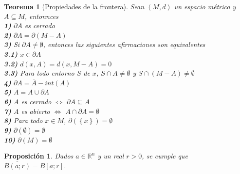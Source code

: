 \documentclass[oneside]{book} %
\theoremstyle{Teorema}
\newtheorem{Teorema}[Definicion]{Teorema}
\newtheorem{Proposicion}[Definicion]{Proposición}
\theoremstyle{Ejemplos}
\theoremstyle{[Obs]}
\renewcommand{\{}{\left\lbrace} %
\renewcommand{\}}{\right\rbrace} %
\renewcommand{\u}{\cup} %
\newcommand{\n}{\cap} %
\renewcommand{\sc}{\subseteq} %
\newcommand{\Rn}{\mathbb{R}^n} %
\begin{document}
			\begin{Teorema}[Propiedades de la frontera]
				
				Sean $(M, d)$ un espacio métrico y $A \sc M$, entonnces \\

				\textbf{1)} $\partial A$ es cerrado \\
				
				\textbf{2)} $\partial A = \partial(M - A)$ \\

				\textbf{3)} Si $\partial A \neq \emptyset$, entonces las siguientes afirmaciones son equivalentes \\

				\hspace{1cm} \textbf{3.1)} $x \in \partial A$ \\

				\hspace{1cm} \textbf{3.2)} $d(x, A) = d(x, M - A) = 0$ \\

				\hspace{1cm} \textbf{3.3)} Para todo entorno $S$ de $x$, $S \n A \neq \emptyset$ y $S \n (M - A) \neq \emptyset$ \\

				\textbf{4)} $\partial A = \overline{A} - int(A)$ \\

				\textbf{5)} $\overline{A} = A \u \partial A$ \\

				\textbf{6)} $A$ es cerrado $\Leftrightarrow$ $\partial A \sc A$ \\
				
				\textbf{7)} $A$ es abierto $\Leftrightarrow$ $A \n \partial A = \emptyset$ \\

				\textbf{8)} Para todo $x \in M$, $\partial ( \{ x \} ) = \emptyset$ \\

				\textbf{9)} $\partial(\emptyset) = \emptyset$ \\

				\textbf{10)} $\partial(M) = \emptyset$ \\

			\end{Teorema}

			\begin{Proposicion}
				
				Dados $a \in \Rn$ y un real $r > 0$, se cumple que $\overline{B(a;r)} = B[a;r]$. \\

			\end{Proposicion}
\end{document}
